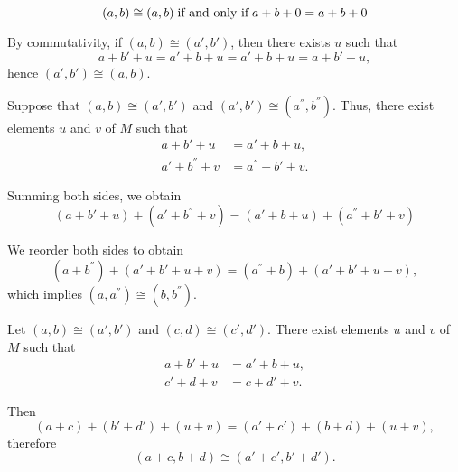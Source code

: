 \begin{defproof}
  \begin{equation*}
    (a, b) \cong (a, b) \T{if and only if} a + b + 0 = a + b + 0
  \end{equation*}

   By commutativity, if \( (a, b) \cong (a', b') \), then there exists \( u \) such that
  \begin{equation*}
    a + b' + u = a' + b + u
    =
    a' + b + u = a + b' + u,
  \end{equation*}
  hence \( (a', b') \cong (a, b) \).

   Suppose that \( (a, b) \cong (a', b') \) and \( (a', b') \cong (a^\dprime, b^\dprime) \). Thus, there exist elements \( u \) and \( v \) of \( M \) such that
  \begin{align*}
    a + b' + u         &= a' + b + u, \\
    a' + b^\dprime + v &= a^\dprime + b' + v.
  \end{align*}

  Summing both sides, we obtain
  \begin{equation*}
    (a + b' + u) + (a' + b^\dprime + v) = (a' + b + u) + (a^\dprime + b' + v)
  \end{equation*}

  We reorder both sides to obtain
  \begin{equation*}
    (a + b^\dprime) + (a' + b' + u + v) = (a^\dprime + b) + (a' + b' + u + v),
  \end{equation*}
  which implies \( (a, a^\dprime) \cong (b, b^\dprime) \).

   Let \( (a, b) \cong (a', b') \) and \( (c, d) \cong (c', d') \). There exist elements \( u \) and \( v \) of \( M \) such that
  \begin{align*}
    a + b' + u &= a' + b + u, \\
    c' + d + v &= c + d' + v.
  \end{align*}

  Then
  \begin{equation*}
    (a + c) + (b' + d') + (u + v) = (a' + c') + (b + d) + (u + v),
  \end{equation*}
  therefore
  \begin{equation*}
    (a + c, b + d) \cong (a' + c', b' + d').
  \end{equation*}


\end{defproof}
